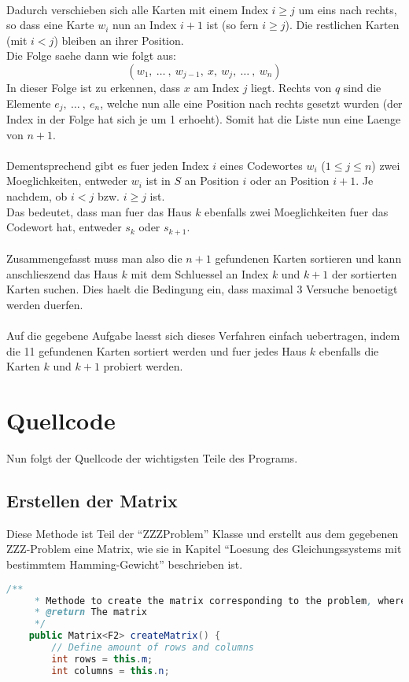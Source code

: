 \documentclass[a4paper,10pt,ngerman]{scrartcl}
\begin{document}
{\\Dadurch verschieben sich alle Karten mit einem Index $i \geq j$ um eins nach rechts, so dass eine Karte $w_i$ nun an Index $i+1$ ist (so fern $i \geq j$). Die restlichen Karten (mit $i < j$) bleiben an ihrer Position.\\
Die Folge saehe dann wie folgt aus:
$$(w_1, \ \dots \ , \ w_{j-1}, \ x, \ w_{j}, \ \dots \ , \ w_n)$$
In dieser Folge ist zu erkennen, dass $x$ am Index $j$ liegt. Rechts von $q$ sind die Elemente $e_{j}, \ \dots \ , \ e_n$, welche nun alle eine Position nach rechts  gesetzt wurden (der Index in der Folge hat sich je um 1 erhoeht). Somit hat die Liste nun eine Laenge von $n+1$.
\\\\
Dementsprechend gibt es fuer jeden Index $i$ eines Codewortes $w_i$ ($1 \leq j \leq n$) zwei Moeglichkeiten, entweder $w_i$ ist in $S$ an Position $i$ oder an Position $i+1$.
Je nachdem, ob $i < j$ bzw. $i \geq j$ ist.\\
Das bedeutet, dass man fuer das Haus $k$ ebenfalls zwei Moeglichkeiten fuer das Codewort hat, entweder $s_k$ oder $s_{k+1}$. 
\\\\
Zusammengefasst muss man also die $n+1$ gefundenen Karten sortieren und kann anschlieszend das Haus $k$ mit dem Schluessel an Index $k$ und $k+1$ der sortierten Karten suchen. Dies haelt die Bedingung ein, dass maximal 3 Versuche benoetigt werden duerfen.
\\\\
Auf die gegebene Aufgabe laesst sich dieses Verfahren einfach uebertragen, indem die 11 gefundenen Karten sortiert werden und fuer jedes Haus $k$ ebenfalls die Karten $k$ und $k+1$ probiert werden. 

\section{Quellcode}
Nun folgt der Quellcode der wichtigsten Teile des Programs.

\subsection{Erstellen der Matrix}
Diese Methode ist Teil der "`ZZZProblem"' Klasse und erstellt aus dem gegebenen ZZZ-Problem eine Matrix,  wie sie in Kapitel "`Loesung des Gleichungssystems mit bestimmtem Hamming-Gewicht"' beschrieben ist.
\\
\begin{lstlisting}[language=Java]
    /**
     * Methode to create the matrix corresponding to the problem, where each bit sequences is a column
     * @return The matrix
     */
    public Matrix<F2> createMatrix() {
        // Define amount of rows and columns
        int rows = this.m;
        int columns = this.n;


\end{lstlisting}}
\end{document}
